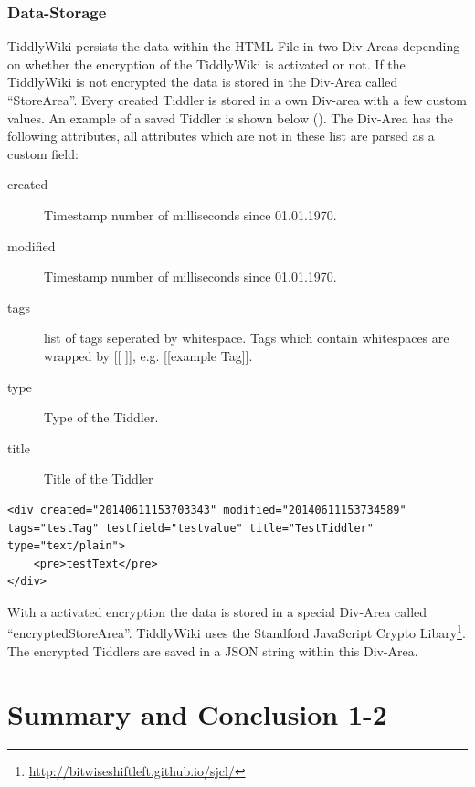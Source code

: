 \documentclass[12pt,a4paper]{article}
\begin{document}
\subsubsection*{Data-Storage}
TiddlyWiki persists the data within the HTML-File in two Div-Areas depending on whether the encryption of the TiddlyWiki is activated or not. If the TiddlyWiki is not encrypted the data is stored in the Div-Area called ``StoreArea''. Every created Tiddler is stored in a own Div-area with a few custom values. An example of a saved Tiddler is shown below (). The Div-Area has the following attributes, all attributes which are not in these list are parsed as a custom field:
\begin{description}
\item[created] Timestamp number of milliseconds since 01.01.1970.
\item[modified] Timestamp number of milliseconds since 01.01.1970.
\item[tags] list of tags seperated by whitespace. Tags which contain whitespaces are wrapped by [[ ]], e.g. [[example Tag]].
\item[type] Type of the Tiddler.
\item[title] Title of the Tiddler
\end{description}


\begin{lstlisting}[caption={Data-Div},label=lst:data-div]
<div created="20140611153703343" modified="20140611153734589" tags="testTag" testfield="testvalue" title="TestTiddler" type="text/plain">
	<pre>testText</pre>
</div>
\end{lstlisting}
With a activated encryption the data is stored in a special Div-Area called ``encryptedStoreArea''. TiddlyWiki uses the Standford JavaScript Crypto Libary\footnote{\url{http://bitwiseshiftleft.github.io/sjcl/}}. The encrypted Tiddlers are saved in a JSON string within this Div-Area.
\section{Summary and Conclusion 1-2}


\end{document}
